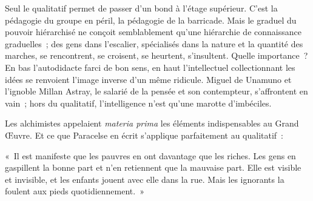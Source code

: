 \documentclass[french,twoside]{book} %
\newenvironment{quoteblock}%
  {\begin{quoting}}
  {\end{quoting}}
\newenvironment{quotebar}{%
    \def\FrameCommand{{\color{rubric!10!}\vrule width 0.5em} \hspace{0.9em}}%
    \def\OuterFrameSep{\itemsep} %
    \MakeFramed {\advance\hsize-\width \FrameRestore}
  }%
  {%
    \endMakeFramed
  }
\renewenvironment{quoteblock}%
  {%
    \savenotes
    \setstretch{0.9}
    \normalfont
    \begin{quotebar}
  }
  {%
    \end{quotebar}
    \spewnotes
  }
\begin{document}
Seul le qualitatif permet de passer d’un bond à l’étage supérieur. C’est la pédagogie du groupe en péril, la pédagogie de la barricade. Mais le graduel du pouvoir hiérarchisé ne conçoit semblablement qu’une hiérarchie de connaissance graduelles ; des gens dans l’escalier, spécialisés dans la nature et la quantité des marches, se rencontrent, se croisent, se heurtent, s’insultent. Quelle importance ? En bas l’autodidacte farci de bon sens, en haut l’intellectuel collectionnant les idées se renvoient l’image inverse d’un même ridicule. Miguel de Unamuno et l’ignoble Millan Astray, le salarié de la pensée et son contempteur, s’affrontent en vain ; hors du qualitatif, l’intelligence n’est qu’une marotte d’imbéciles.\par
Les alchimistes appelaient \emph{materia prima} les éléments indispensables au Grand Œuvre. Et ce que Paracelse en écrit s’applique parfaitement au qualitatif :\par

\begin{quoteblock}
\noindent « Il est manifeste que les pauvres en ont davantage que les riches. Les gens en gaspillent la bonne part et n’en retiennent que la mauvaise part. Elle est visible et invisible, et les enfants jouent avec elle dans la rue. Mais les ignorants la foulent aux pieds quotidiennement. »\end{quoteblock}
\end{document}

